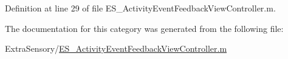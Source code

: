 Definition at line 29 of file E\+S\+\_\+\+Activity\+Event\+Feedback\+View\+Controller.\+m.



The documentation for this category was generated from the following file\+:\begin{DoxyCompactItemize}
\item 
Extra\+Sensory/\hyperlink{_e_s___activity_event_feedback_view_controller_8m}{E\+S\+\_\+\+Activity\+Event\+Feedback\+View\+Controller.\+m}\end{DoxyCompactItemize}

